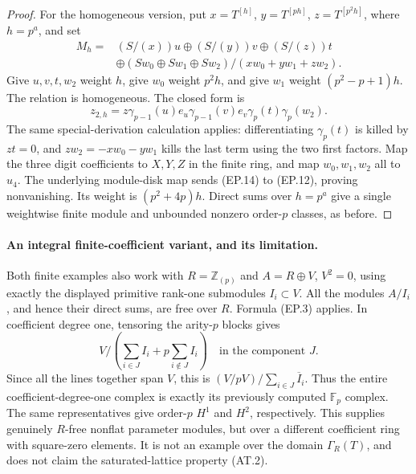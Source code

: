 \begin{proof}
For the homogeneous version, put
\(x=T^{[h]}\), \(y=T^{[ph]}\), \(z=T^{[p^2h]}\),
where \(h=p^a\), and set
\[
 \begin{split}
 M_h={}&(S/(x))u\oplus(S/(y))v\oplus(S/(z))t\\
 &\oplus(Sw_0\oplus Sw_1\oplus Sw_2)/
                              (xw_0+yw_1+zw_2).
 \end{split}                                             \tag{EP.13}
\]
Give \(u,v,t,w_2\) weight \(h\), give \(w_0\) weight
\(p^2h\), and give \(w_1\) weight \((p^2-p+1)h\).
The relation is homogeneous. The closed form is
\[
 z_{2,h}=z\gamma_{p-1}(u)e_u\gamma_{p-1}(v)e_v
                                  \gamma_p(t)\gamma_p(w_2).
                                                               \tag{EP.14}
\]
The same special-derivation calculation applies: differentiating
\(\gamma_p(t)\) is killed by \(zt=0\), and
\(zw_2=-xw_0-yw_1\) kills the last term using the two
first factors. Map the three digit coefficients to \(X,Y,Z\)
in the finite ring, and map \(w_0,w_1,w_2\) all to
\(u_4\). The underlying module-disk map sends (EP.14)
to (EP.12), proving nonvanishing. Its weight is
\((p^2+4p)h\). Direct sums over \(h=p^a\) give a single
weightwise finite module and unbounded nonzero order-\(p\)
classes, as before.
\end{proof}

\paragraph{An integral finite-coefficient variant, and its limitation.}
Both finite examples also work with
\(R=\mathbb Z_{(p)}\) and \(A=R\oplus V\), \(V^2=0\),
using exactly the displayed primitive rank-one submodules
\(I_i\subset V\). All the modules \(A/I_i\), and hence
their direct sums, are free over \(R\). Formula (EP.3)
applies. In coefficient degree one, tensoring the arity-\(p\)
blocks gives
\[
 V\big/\left(\sum_{i\in J} I_i+
                       p\sum_{i\notin J}I_i\right)
                   \quad\text{in the component }J.      \tag{EP.15}
\]
Since all the lines together span \(V\), this is
\((V/pV)/\sum_{i\in J}\overline I_i\). Thus the entire
coefficient-degree-one complex is exactly its previously
computed \(\mathbb F_p\) complex. The same representatives
give order-\(p\) \(H^1\) and \(H^2\), respectively.
This supplies genuinely \(R\)-free nonflat parameter modules,
but over a different coefficient ring with square-zero elements.
It is not an example over the domain \(\Gamma_R(T)\), and
does not claim the saturated-lattice property (AT.2).


